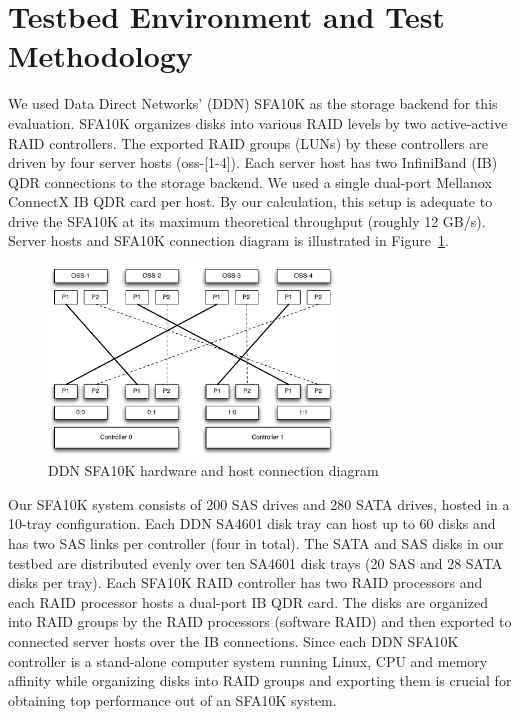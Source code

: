 \section{Testbed Environment and Test Methodology}
\label{sec:testbed}

We used Data Direct Networks' (DDN) SFA10K as the storage backend for this
evaluation. SFA10K organizes disks into various RAID levels by two
active-active RAID controllers. The exported RAID groups (LUNs) by these
controllers are driven by four server hosts (oss-[1-4]).  Each server host has two InfiniBand
(IB) QDR connections to the storage backend.  We used a single dual-port
Mellanox ConnectX IB QDR card per host.  By our calculation, this setup is
adequate to drive the SFA10K at its maximum theoretical throughput (roughly 12
GB/s). Server hosts and SFA10K connection diagram is illustrated in
Figure~\ref{fig:ddn-sfa10k}.

\begin{figure}[htb]
\centering
\includegraphics[width=3in]{figs/sfa10k}
\caption{DDN SFA10K hardware and host connection diagram}
\label{fig:ddn-sfa10k}
\end{figure}


Our SFA10K system consists of 200 SAS drives and 280 SATA drives, hosted in a
10-tray configuration. Each DDN SA4601 disk tray can host up to 60 disks and
has two SAS links per controller (four in total). The SATA and SAS disks in our
testbed are distributed evenly over ten SA4601 disk trays (20 SAS and 28 SATA
disks per tray). Each SFA10K RAID controller has two RAID processors and each
RAID processor hosts a dual-port IB QDR card. The disks are organized into RAID
groups by the RAID processors (software RAID) and then exported to connected
server hosts over the IB connections. Since each DDN SFA10K controller is a
stand-alone computer system running Linux, CPU and memory affinity while
organizing disks into RAID groups and exporting them is crucial for obtaining
top performance out of an SFA10K system.  

